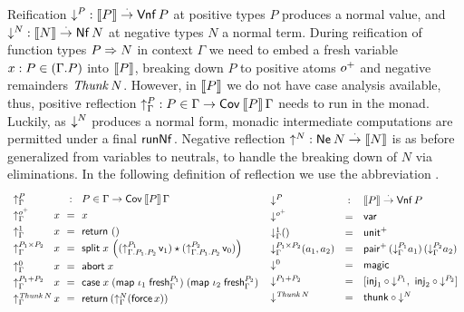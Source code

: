\documentclass[sigplan,screen]{acmart}
\begin{document}
Reification $\mathord{\downarrow_{}^{P}} : \mathopen{{[\kern-0.14em[}} P \mathclose{{]\kern-0.14em]}} \stackrel{\cdot}{\to} \mathsf{Vnf}\,P$ at positive types $P$ produces
a normal value, and $\mathord{\downarrow_{}^{N}} : \mathopen{{[\kern-0.14em[}} N \mathclose{{]\kern-0.14em]}} \stackrel{\cdot}{\to} \mathsf{Nf}\,N$ at negative
types $N$ a
normal term.  During reification of function types $P \Rightarrow N$ in
context $\Gamma$ we need to embed a fresh variable
$x : P \in (\Gamma.P)$ into $\mathopen{{[\kern-0.14em[}} P \mathclose{{]\kern-0.14em]}}$, breaking down $P$ to
positive atoms $o^+$ and negative remainders $\mathit{Thunk}\,N$.
However, in $\mathopen{{[\kern-0.14em[}} P \mathclose{{]\kern-0.14em]}}$ we do not have case analysis available, thus,
positive reflection $\mathord{\uparrow_{\Gamma}^{P}} : P \in \Gamma \to \mathsf{Cov}^{}\,\mathopen{{[\kern-0.14em[}} P \mathclose{{]\kern-0.14em]}}\,\Gamma$
needs to run in the monad.  Luckily, as $\mathord{\downarrow_{}^{N}}$ produces a normal
form, monadic intermediate computations are permitted under a final
$\mathsf{runNf}^{}$.  Negative reflection $\mathord{\uparrow_{}^{N}} : \mathsf{Ne}^{}\,N \stackrel{\cdot}{\to} \mathopen{{[\kern-0.14em[}} N \mathclose{{]\kern-0.14em]}}$ is as
before generalized from variables to neutrals, to handle the breaking
down of $N$ via eliminations.
%
In the following definition of reflection we use the abbreviation
.
\[
\def\arraystretch{1.3}
\begin{array}{l@{\,}l@{~~}c@{~~}l}
  \multicolumn 2 l {\upG P} & : & P \in \Gamma \to \Cov\,\den P \, \Gamma\\
  \upG {\patom}         & x & = & x \\
  \upG {\tyone}         & x & = & \treturn\;\ttempty \\
  \upG {P_1 \times P_2} & x & = & \tsplit\;x\,
    \left(
     (\up[\cext{\cext \Gamma {P_1}}{P_2}]{P_1}\,\vv1)
     \star
     (\up[\cext{\cext \Gamma {P_1}}{P_2}]{P_2}\,\vv0)
    \right) \\
  \upG{\tyzero}         & x & = & \tabort\;x \\
  \upG{P_1 + P_2}       & x & = & \tcase\;x
    \; (\tmap\;\iota_1\;\tfresh^{P_1}_\Gamma)
    \; (\tmap\;\iota_2\;\tfresh^{P_2}_\Gamma)
    \\
  \upG{\Thunk N} & x & = & \treturn\,(\upG N (\tforce\,x)) \\
\end{array}
\,
\begin{array}{lcl}
  \down P & : & \den P \todot \tVNf\,P \\
  \down {\patom} & = & \tvar \\
  \downG {\tyone} () & = & \punit \\
  \downG {P_1 \times P_2}(a_1,a_2) & = & \ppair
    \,(\downG {P_1} a_1)
    \,(\downG {P_2} a_2)
    \\
  \down {\tyzero} & = & \tmagic \\
  \down {P_1 + P_2} & = &
    [  \tinj_1 \comp \down{P_1}
    ,\ \tinj_2 \comp \down{P_2}
    ] \\
  \down {\Thunk N} & = & \tthunk \circ \down N \\
\end{array}
\]
\end{document}
